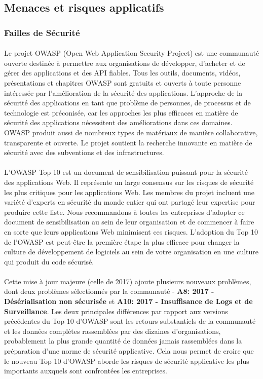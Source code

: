 \subsection{Menaces et risques applicatifs}
  \subsubsection{Failles de Sécurité}
    \paragraph{}
    Le projet OWASP (Open Web Application Security Project) est une communauté ouverte destinée à permettre aux organisations de développer, d'acheter et de gérer des applications et des API fiables. Tous les outils, documents, vidéos, présentations et chapitres OWASP sont gratuits et ouverts à toute personne intéressée par l'amélioration de la sécurité des applications. L'approche de la sécurité des applications en tant que problème de personnes, de processus et de technologie est  préconis\'ee, car les approches les plus efficaces en matière de sécurité des applications nécessitent des améliorations dans ces domaines. OWASP produit aussi de nombreux types de matériaux de manière collaborative, transparente et ouverte. Le projet soutient la recherche innovante en matière de sécurité avec des subventions et des infrastructures.
    
    \paragraph{}
    L'OWASP Top 10 est un document de sensibilisation puissant pour la sécurité des applications Web. Il représente un large consensus sur les risques de sécurité les plus critiques pour les applications Web. Les membres du projet incluent une variété d'experts en sécurité du monde entier qui ont partagé leur expertise pour produire cette liste.
    Nous recommandons \`a toutes les entreprises d'adopter ce document de sensibilisation au sein de leur organisation et de commencer à faire en sorte que leurs applications Web minimisent ces risques. L'adoption du Top 10 de l'OWASP est peut-être la première étape la plus efficace pour changer la culture de développement de logiciels au sein de votre organisation en une culture qui produit du code sécurisé.
    \paragraph{}
    Cette mise à jour majeure (celle de 2017) ajoute plusieurs nouveaux problèmes, dont deux problèmes sélectionnés par la communauté - \textbf{A8: 2017 - Dés\'erialisation non sécurisée} et \textbf{A10: 2017 - Insuffisance de Logs et de Surveillance}. Les deux principales différences par rapport aux versions précédentes du Top 10 d'OWASP sont les retours substantiels de la communauté et les données complètes rassemblées par des dizaines d'organisations, probablement la plus grande quantité de données jamais rassemblées dans la préparation d'une norme de sécurité applicative. Cela nous permet de croire que le nouveau Top 10 d'OWASP aborde les risques de sécurité applicative les plus importants auxquels sont confrontées les entreprises.
